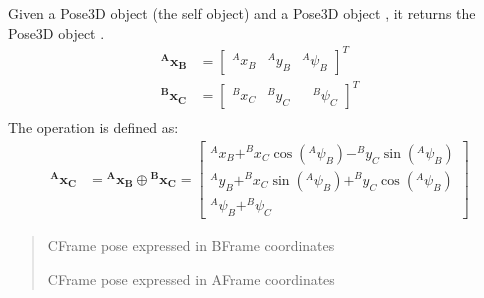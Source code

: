 \documentclass[letterpaper,10pt,english]{sphinxmanual}
\begin{document}
\begin{fulllineitems}
\begin{fulllineitems}
\label{\detokenize{Pose:Pose.Pose3D.oplus}}
\pysigstartsignatures
{}
\pysigstopsignatures
\sphinxAtStartPar
Given a Pose3D object  (the self object) and a Pose3D object , it returns the Pose3D object .
\begin{equation*}
\begin{split}\mathbf{{^A}x_B} &= \begin{bmatrix} ^Ax_B & ^Ay_B & ^A\psi_B \end{bmatrix}^T \\
\mathbf{{^B}x_C} &= \begin{bmatrix} ^Bx_C & ^By_C & & ^B\psi_C \end{bmatrix}^T \\\end{split}
\end{equation*}
\sphinxAtStartPar
The operation is defined as:
\begin{equation}\label{equation:Pose:eq-oplus3dof}
\begin{split}\mathbf{{^A}x_C} &= \mathbf{{^A}x_B} \oplus \mathbf{{^B}x_C} =
\begin{bmatrix}
    ^Ax_B + ^Bx_C  \cos(^A\psi_B) - ^By_C  \sin(^A\psi_B) \\
    ^Ay_B + ^Bx_C  \sin(^A\psi_B) + ^By_C  \cos(^A\psi_B) \\
    ^A\psi_B + ^B\psi_C
\end{bmatrix}\end{split}
\end{equation}\begin{quote}\begin{description}
\sphinxAtStartPar
{} \textendash{} C\sphinxhyphen{}Frame pose expressed in B\sphinxhyphen{}Frame coordinates

\sphinxAtStartPar
C\sphinxhyphen{}Frame pose expressed in A\sphinxhyphen{}Frame coordinates

\end{description}\end{quote}

\end{fulllineitems}



\end{fulllineitems}
\end{document}
